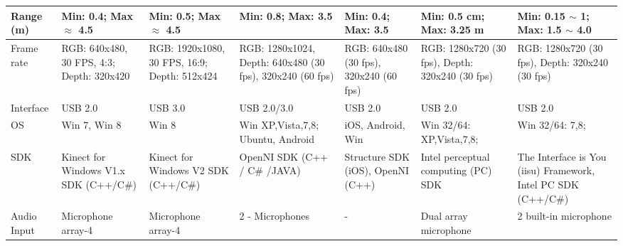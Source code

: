 \begin{landscape}
\begin{table}[H]
\begin{tabularx}{600pt}{c*6{X}}
  \multicolumn{1}{l}{Range (m)}           & Min: 0.4; Max $\approx$ 4.5 
  										 & Min: 0.5; Max $\approx$ 4.5
  										 & Min: 0.8; Max: 3.5
  										 & Min: 0.4; Max: 3.5  
  										 & Min: 0.5 cm; Max: 3.25 m 
  										 & Min: 0.15 $\sim$ 1; Max: 1.5 $\sim$ 4.0 
  										 \tabularnewline\midrule
  										 										 

  \multicolumn{1}{l}{Frame rate }         & RGB: 640x480, 30 FPS, 4:3; Depth: 320x420
  										 & RGB: 1920x1080, 30 FPS, 16:9; Depth: 512x424
  										 & RGB: 1280x1024, Depth: 640x480 (30 fps), 320x240 (60 fps)
  										 & RGB: 640x480 (30 fps), 320x240 (60 fps)
  										 & RGB: 1280x720 (30 fps), Depth: 320x240 (30 fps)
  										 & RGB: 1280x720 (30 fps), Depth: 320x240 (30 fps)
  										 \tabularnewline\midrule
  										 
  \multicolumn{1}{l}{Interface}           & USB 2.0
  										 & USB 3.0
  										 & USB 2.0/3.0 
  										 & USB 2.0
  										 & USB 2.0
  										 & USB 2.0
  										 \tabularnewline\midrule	
  
  \multicolumn{1}{l}{OS}                 & Win 7, Win 8
  										 & Win 8
  										 & Win XP,Vista,7,8; Ubuntu, Android
  										 & iOS, Android, Win
  										 & Win 32/64: XP,Vista,7,8;
  										 & Win 32/64: 7,8; 
  										 \tabularnewline\midrule	
  										 										 								
  
  \multicolumn{1}{l}{SDK}                & Kinect for Windows V1.x SDK (C++/C\#)
  										 & Kinect for Windows V2 SDK (C++/C\#)
  										 & OpenNI SDK (C++ / C\# /JAVA)
  										 & Structure SDK (iOS), OpenNI (C++)
  										 & Intel perceptual computing (PC) SDK 
  										 & The Interface is You (iisu) Framework, Intel PC SDK (C++/C\#)
  										 \tabularnewline\midrule	
  										 
 \multicolumn{1}{l}{Audio Input}        &  Microphone array-4%
  										&  Microphone array-4%
  										&  2 - Microphones 
  										&  - 
  										&  Dual array microphone 
  										&  2 built-in microphone
  										\tabularnewline
  										\bottomrule
\end{tabularx}
\end{table}
\end{landscape}